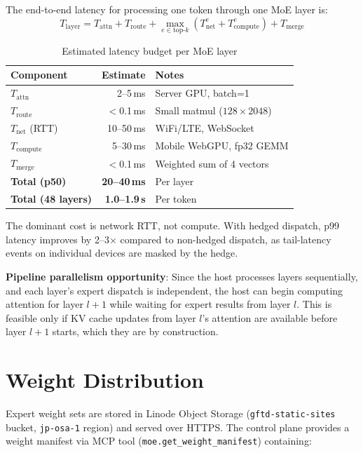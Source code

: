\documentclass[11pt,a4paper]{article}
\begin{document}
The end-to-end latency for processing one token through one MoE layer
is:
\begin{equation}
  T_{\text{layer}} = T_{\text{attn}} + T_{\text{route}} +
    \max_{e \in \text{top-}k}
    \left(T_{\text{net}}^e + T_{\text{compute}}^e\right) +
    T_{\text{merge}}
  \label{eq:latency}
\end{equation}

\begin{table}[h]
\centering
\caption{Estimated latency budget per MoE layer}
\label{tab:latency}
\begin{tabular}{@{}lrl@{}}
\toprule
Component & Estimate & Notes \\
\midrule
$T_{\text{attn}}$ & 2--5\,ms & Server GPU, batch=1 \\
$T_{\text{route}}$ & $<$0.1\,ms & Small matmul ($128 \times 2048$) \\
$T_{\text{net}}$ (RTT) & 10--50\,ms & WiFi/LTE, WebSocket \\
$T_{\text{compute}}$ & 5--30\,ms & Mobile WebGPU, fp32 GEMM \\
$T_{\text{merge}}$ & $<$0.1\,ms & Weighted sum of 4 vectors \\
\midrule
\textbf{Total (p50)} & \textbf{20--40\,ms} & Per layer \\
\textbf{Total (48 layers)} & \textbf{1.0--1.9\,s} & Per token \\
\bottomrule
\end{tabular}
\end{table}

The dominant cost is network RTT, not compute. With hedged dispatch,
p99 latency improves by 2--3$\times$ compared to non-hedged dispatch,
as tail-latency events on individual devices are masked by the hedge.

\textbf{Pipeline parallelism opportunity}: Since the host processes
layers sequentially, and each layer's expert dispatch is independent,
the host can begin computing attention for layer $l+1$ while waiting
for expert results from layer $l$. This is feasible only if KV cache
updates from layer $l$'s attention are available before layer $l+1$
starts, which they are by construction.

\section{Weight Distribution}
\label{sec:weights}

Expert weight sets are stored in Linode Object Storage
(\texttt{gftd-static-sites} bucket, \texttt{jp-osa-1} region) and
served over HTTPS. The control plane provides a weight manifest via
MCP tool (\texttt{moe.get\_weight\_manifest}) containing:
\end{document}
